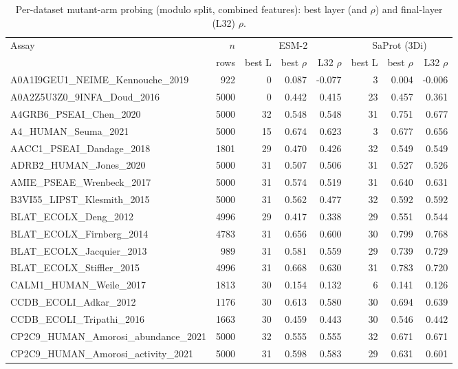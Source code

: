 \documentclass[11pt,a4paper]{article}
\begin{document}
\begin{table}[H]\centering\scriptsize
\caption{Per-dataset mutant-arm probing (modulo split, combined features): best layer (and $\rho$) and final-layer (L32) $\rho$.}
\label{tab:S3perdataset}
\begin{tabular}{lrrrrrrr}
\toprule
Assay & $n$ & \multicolumn{3}{c}{ESM-2} & \multicolumn{3}{c}{SaProt (3Di)} \\
 & rows & best L & best $\rho$ & L32 $\rho$ & best L & best $\rho$ & L32 $\rho$ \\
\midrule
A0A1I9GEU1\_NEIME\_Kennouche\_2019 & 922 & 0 & 0.087 & -0.077 & 3 & 0.004 & -0.006 \\
A0A2Z5U3Z0\_9INFA\_Doud\_2016 & 5000 & 0 & 0.442 & 0.415 & 23 & 0.457 & 0.361 \\
A4GRB6\_PSEAI\_Chen\_2020 & 5000 & 32 & 0.548 & 0.548 & 31 & 0.751 & 0.677 \\
A4\_HUMAN\_Seuma\_2021 & 5000 & 15 & 0.674 & 0.623 & 3 & 0.677 & 0.656 \\
AACC1\_PSEAI\_Dandage\_2018 & 1801 & 29 & 0.470 & 0.426 & 32 & 0.549 & 0.549 \\
ADRB2\_HUMAN\_Jones\_2020 & 5000 & 31 & 0.507 & 0.506 & 31 & 0.527 & 0.526 \\
AMIE\_PSEAE\_Wrenbeck\_2017 & 5000 & 31 & 0.574 & 0.519 & 31 & 0.640 & 0.631 \\
B3VI55\_LIPST\_Klesmith\_2015 & 5000 & 31 & 0.562 & 0.477 & 32 & 0.592 & 0.592 \\
BLAT\_ECOLX\_Deng\_2012 & 4996 & 29 & 0.417 & 0.338 & 29 & 0.551 & 0.544 \\
BLAT\_ECOLX\_Firnberg\_2014 & 4783 & 31 & 0.656 & 0.600 & 30 & 0.799 & 0.768 \\
BLAT\_ECOLX\_Jacquier\_2013 & 989 & 31 & 0.581 & 0.559 & 29 & 0.739 & 0.729 \\
BLAT\_ECOLX\_Stiffler\_2015 & 4996 & 31 & 0.668 & 0.630 & 31 & 0.783 & 0.720 \\
CALM1\_HUMAN\_Weile\_2017 & 1813 & 30 & 0.154 & 0.132 & 6 & 0.141 & 0.126 \\
CCDB\_ECOLI\_Adkar\_2012 & 1176 & 30 & 0.613 & 0.580 & 30 & 0.694 & 0.639 \\
CCDB\_ECOLI\_Tripathi\_2016 & 1663 & 30 & 0.459 & 0.443 & 30 & 0.546 & 0.442 \\
CP2C9\_HUMAN\_Amorosi\_abundance\_2021 & 5000 & 32 & 0.555 & 0.555 & 32 & 0.671 & 0.671 \\
CP2C9\_HUMAN\_Amorosi\_activity\_2021 & 5000 & 31 & 0.598 & 0.583 & 29 & 0.631 & 0.601 \\

\end{tabular}
\end{table}
\end{document}
